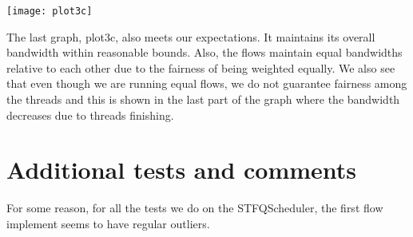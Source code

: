 \documentclass[11pt, letterpaper]{article}
\begin{document}
\centerline{\texttt{[image: plot3c]}}

The last graph, plot3c, also meets our expectations.  It maintains its overall bandwidth within reasonable bounds.  Also, the flows maintain equal bandwidths relative to each other due to the fairness of being weighted equally.  We also see that even though we are running equal flows, we do not guarantee fairness among the threads and this is shown in the last part of the graph where the bandwidth decreases due to threads finishing.







\section{Additional tests and comments}

For some reason, for all the tests we do on the STFQScheduler, the first flow implement seems to have regular outliers.
\end{document}
